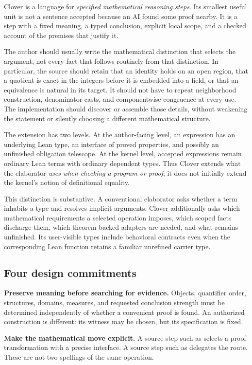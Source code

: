 \documentclass[11pt,a4paper]{article}
\newcommand{\code}[1]{\texttt{\detokenize{#1}}}
\theoremstyle{definition}
\theoremstyle{remark}
\begin{document}
Clover is a language for \emph{specified mathematical reasoning steps}. Its
smallest useful unit is not a sentence accepted because an AI found some proof
nearby. It is a step with a fixed meaning, a typed conclusion, explicit local
scope, and a checked account of the premises that justify it.

The author should usually write the mathematical distinction that selects the
argument, not every fact that follows routinely from that distinction. In
particular, the source should retain that an identity holds on an open region,
that a quotient is exact in the integers before it is embedded into a field,
or that an equivalence is natural in its target. It should not have to repeat
neighborhood construction, denominator casts, and componentwise congruence at
every use. The implementation should discover or assemble those details,
without weakening the statement or silently choosing a different mathematical
structure.

The extension has two levels. At the author-facing level, an expression has
an underlying Lean type, an interface of proved properties, and possibly an
unfinished obligation telescope. At the kernel level, accepted expressions
remain ordinary Lean terms with ordinary dependent types. Thus Clover extends
what the elaborator \emph{uses when checking a program or proof}; it does not
initially extend the kernel's notion of definitional equality.

This distinction is substantive. A conventional elaborator asks whether a
term inhabits a type and resolves implicit arguments. Clover additionally asks
which mathematical requirements a selected operation imposes, which scoped
facts discharge them, which theorem-backed adapters are needed, and what
remains unfinished. Its user-visible types include behavioral contracts even
when the corresponding Lean function retains a familiar unrefined carrier
type.

\subsection{Four design commitments}

\textbf{Preserve meaning before searching for evidence.} Objects, quantifier
order, structures, domains, measures, and requested conclusion strength must
be determined independently of whether a convenient proof is found. An
authorized construction is different: its witness may be chosen, but its
specification is fixed.

\textbf{Make the mathematical move explicit.} A source step such as
\code{differentiate on U} selects a proof transformation with a precise
interface. A source step such as \code{search} delegates the route. These are
not two spellings of the same operation.
\end{document}
